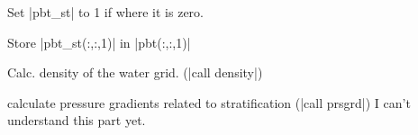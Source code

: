 
\been
\item Set |pbt_st| to 1 if where it is zero.
\item Store |pbt_st(:,:,1)| in |pbt(:,:,1)|
\item Calc. density of the water grid. (|call density|)
\item calculate pressure gradients related to stratification (|call prsgrd|)
{\color{red} I can't understand this part yet.}

\enen
